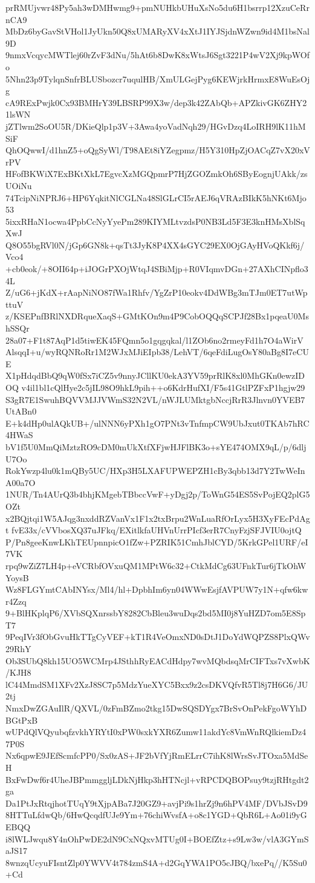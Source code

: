prRMUjvwr48Py5ah3wDMHwmg9+pmNUHkbUHuXsNo5du6H1bsrrp12XzuCeRrnCA9
MbDz6byGavStVHol1JyUkn50Q8xUMARyXV4xXtJ1IYJSjdnWZwn9id4M1bsNal9D
9nmxVcqycMWTlej60rZvF3dNu/5hAt6b8DwK8xWtsJ6Sgt3221P4wV2Xj9kpWOfo
5Nhn23p9TylqnSnfrBLUSbozcr7uqulHB/XmULGejPyg6KEWjrkHrmxE8WuEsOjg
cA9RExPwjk0Cx93BMHrY39LBSRP99X3w/dep3k42ZAbQb+APZkivGK6ZHY21lsWN
jZTlwm2SoOU5R/DKieQlp1p3V+3Awa4yoVadNqh29/HGvDzq4LoIRH9lK11hMSiF
QhOQwwI/d1hnZ5+oQgSyWl/T98AEt8iYZegpmz/H5Y310HpZjOACqZ7vX20xVrPV
HFofBKWiX7ExBKtXkL7EgvcXzMGQpmrP7HjZGOZmkOh6SByEognjUAkk/zsUOiNu
74TcipNiNPRJ6+HP6YqkitNlCGLNa48SlGLrCI5rAEJ6qVRAzBIkK5hNKt6Mjo53
5ixxRHaN1ocwa4PpbCcNyYyePm289KIYMLtvzdsP0NB3Ld5F3E3knHMsXblSqXwJ
Q8O55bgRVl0N/jGp6GN8k+qsTt3JyK8P4XX4sGYC29EX0OjGAyHVoQKkf6j/Vco4
+cb0eok/+8OII64p+iJOGrPXOjWtqJ4SBiMjp+R0VIqmvDGn+27AXhCINpflo34L
Z/uG6+jKdX+rAapNiNO87fWa1Rhfv/YgZrP10eokv4DdWBg3mTJm0ET7utWpttuV
z/KSEPnfBRlNXDRqueXaqS+GMtKOn9m4P9CobOQQqSCPJf28Bx1pqeaU0MshSSQr
28a07+F1t87AqP1d5tiwEK45FQmn5o1gqgqkal/l1ZOb6no2rmeyFd1h7O4aWirV
AlsqqI+u/wyRQNRoRr1M2WJxMJiEIpb38/LehVT/6qeFdiLugOsY80aBg8I7eCUE
X1pHdqdBbQ9qW0fSx7iCZ5v9nnyJCllKU0ekA3YV59prRlK8xl0MhGKn0ewzIDOQ
v4il1bl1cQlHye2c5jIL98O9hkL9pih++o6KdrHufXI/F5s41GtlPZFxP1hgjw29
S3gR7E1SwuhBQVVMJJVWmS32N2VL/nWJLUMktgbNccjRrR3Jlnvn0YVEB7UtABn0
E+k4dHp0ulAQkUB+/ulNNN6yPXh1gO7PNt3vTnfmpCW9UbJxut0TKAb7hRC4HWaS
bV1f5U0MmQiMztzRO9cDM0mUkXtfXFjwHJFlBK3o+sYE474OMX9qL/p/6dljU7Oo
RokYwzp4lu0k1mQBy5UC/HXp3H5LXAFUPWEPZH1cBy3qbb13d7Y2TwWeInA00a7O
1NUR/Tn4AUrQ3b4bhjKMgebTBbccVwF+yDgj2p/ToWnG54ES5SvPojEQ2plG5OZt
x2BQjtqi1W5AJqg3nxddRZVanVx1F1x2txBrpu2WnLuaRfOrLyx5H3XyFEcPdAgt
fvE33x/cVVbosXQ37uJFkq/EXitlkfaUHVnUrrPIcf3erR7CnyFzjSFJVIU0ojtQ
P/Pn8geeKnwLKhTEUpnnpicO1fZw+PZRIK51CmhJblCYD/5KrkGPel1URF/eI7VK
rpq9wZiZ7LH4p+eVCRbfOVxuQM1MPtW6c32+CtkMdCg63UFnkTur6jTkOhWYoysB
Wz8FLGYmtCAbINYsx/Ml4/hl+DpbhIm6yn04WWwEsjfAVPUW7y1N+qfw6kwr4Zzq
9+BlHKplqP6/XVbSQXnrssbY8282CbBleu3wuDqs2bd5MI0j8YuHZD7om5E8SpT7
9PeqIVr3fObGvuHkTTgCyVEF+kT1R4VeOmxND0sDtJ1DoYdWQPZS8PlxQWv29RhY
Ob3SUbQ8kh15UO5WCMrp4JSthhRyEACdHdpy7wvMQbdsqMrCIFTxs7vXwbK/KJH8
lC44MmdSM1XFv2XzJ8SC7p5MdzYueXYC5Bxx9z2csDKVQfvR5Tl8j7H6G6/JU2tj
NmxDwZGAuIlR/QXVL/0zFmBZmo2tkg15DwSQSDYgx7BrSvOnPekFgoWYhDBGtPxB
wUPdQlVQyubqfzvkhYRYtI0xPW0sxkYXR6Zumw11akdYc8VmWnRQlkiemDz47P0S
Nx6qpwE9JEfScmfcPP0/Sx0zAS+JF2bVfYjRmELrrC7ihK8lWrsSvJTOxa5MdSeH
BxFwDwf6r4UheJBPmmggljLDkNjHkp3hHTNcjl+vRPCDQBOPsuy9tzjRHtgdt2ga
Da1PtJxRtqjhotTUqY9tXjpABa7J20GZ9+avjPi9s1hrZj9n6hPV4MF/DVbJSvD9
8HTTuLfdwQb/6HwQcqdfUJe9Ym+76chiWvsfA+o8c1YGD+QbR6L+Ao01i9yGEBQQ
i8lWLJwqu8Y4nOhPwDE2dN9CxNQxvMTUg0I+BOEfZtz+s9Lw3w/vlA3GYmSaJS17
8wnzqUcyuFIsntZlp0YWVV4t784zmS4A+d2GqYWA1PO5cJBQ/bxePq//K5Su0+Cd
